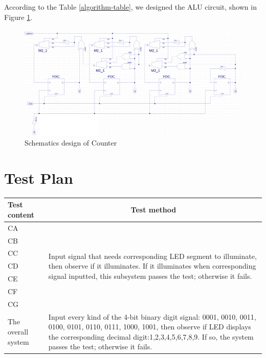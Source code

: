 \documentclass{article}
\begin{document}
According to the Table \ref{algorithm-table}, we designed the ALU circuit, shown in Figure \ref{design-counter}. \\

\begin{figure}[!htbp]
\centering
\includegraphics[width=0.95\linewidth]{counter.png}
\caption{Schematics design of Counter}
\label{design-counter}
\end{figure}

\newpage

\section{Test Plan}
\begin{center}
\begin{tabular}{|m{3cm}<{\centering}|m{10cm}|}
\hline
Test content & \multicolumn{1}{c|}{Test method} \\\hline
CA & \multirow{7}{10cm}{Input signal that needs corresponding LED segment to illuminate, then observe if it illuminates. If it illuminates when corresponding signal inputted, this subsystem passes the test; otherwise it fails.} \\\cline{1-1}
CB & \\\cline{1-1}
CC & \\\cline{1-1}
CD & \\\cline{1-1}
CE & \\\cline{1-1}
CF & \\\cline{1-1}
CG & \\\hline
The overall system & Input every kind of the 4-bit binary digit signal: 0001, 0010, 0011, 0100, 0101, 0110, 0111, 1000, 1001, then observe if LED displays the corresponding decimal digit:1,2,3,4,5,6,7,8,9. If so, the system passes the test; otherwise it fails. \\\hline
\end{tabular}
\end{center}
\end{document}
